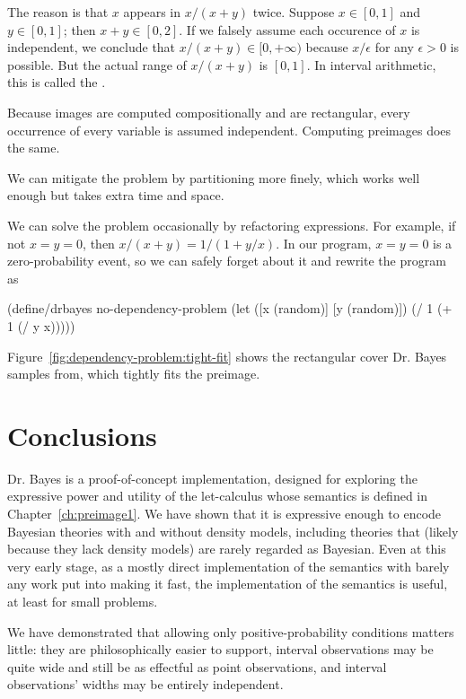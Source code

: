 The reason is that $x$ appears in $x{/}(x+y)$ twice.
Suppose $x \in [0,1]$ and $y \in [0,1]$; then $x + y \in [0,2]$.
If we falsely assume each occurence of $x$ is independent, we conclude that $x{/}(x + y) \in [0,+\infty)$ because $x{/}\epsilon$ for any $\epsilon > 0$ is possible.
But the actual range of $x{/}(x+y)$ is $[0,1]$.
In interval arithmetic, this is called the .

Because images are computed compositionally and are rectangular, every occurrence of every variable is assumed independent.
Computing preimages does the same.

We can mitigate the problem by partitioning more finely, which works well enough but takes extra time and space.

We can solve the problem occasionally by refactoring expressions.
For example, if not $x = y = 0$, then $x{/}(x+y) = 1{/}(1+y{/}x)$.
In our program, $x = y = 0$ is a zero-probability event, so we can safely forget about it and rewrite the program as
\begin{center}\singlespacing
\begin{schemedisplay}
(define/drbayes no-dependency-problem
  (let ([x  (random)]
        [y  (random)])
    (/ 1 (+ 1 (/ y x)))))
\end{schemedisplay}
\end{center}
Figure~\ref{fig:dependency-problem:tight-fit} shows the rectangular cover Dr. Bayes samples from, which tightly fits the preimage.


\section{Conclusions}

Dr. Bayes is a proof-of-concept implementation, designed for exploring the expressive power and utility of the let-calculus whose semantics is defined in Chapter~\ref{ch:preimage1}.
We have shown that it is expressive enough to encode Bayesian theories with and without density models, including theories that (likely because they lack density models) are rarely regarded as Bayesian.
Even at this very early stage, as a mostly direct implementation of the semantics with barely any work put into making it fast, the implementation of the semantics is useful, at least for small problems.

We have demonstrated that allowing only positive-probability conditions matters little: they are philosophically easier to support, interval observations may be quite wide and still be as effectful as point observations, and interval observations' widths may be entirely independent.

